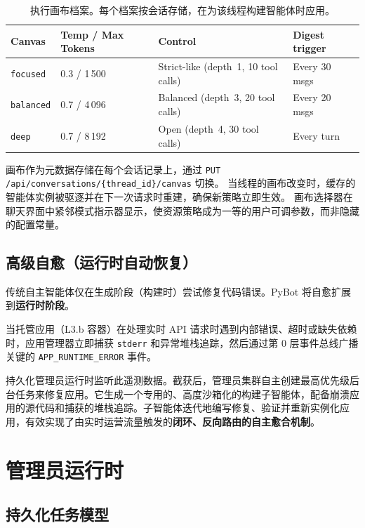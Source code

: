 \documentclass[11pt,a4paper]{article}
\begin{document}
\begin{table}[h]
\centering
\small
\begin{tabularx}{\textwidth}{lXXX}
\toprule
\textbf{Canvas} & \textbf{Temp / Max Tokens} & \textbf{Control} & \textbf{Digest trigger} \\
\midrule
\texttt{focused}  & 0.3 / 1\,500 & Strict-like (depth~1, 10 tool calls) & Every 30 msgs \\
\texttt{balanced} & 0.7 / 4\,096 & Balanced (depth~3, 20 tool calls)    & Every 20 msgs \\
\texttt{deep}     & 0.7 / 8\,192 & Open (depth~4, 30 tool calls)        & Every turn \\
\bottomrule
\end{tabularx}
\caption{执行画布档案。每个档案按会话存储，在为该线程构建智能体时应用。}
\label{tab:canvas}
\end{table}

画布作为元数据存储在每个会话记录上，通过 \texttt{PUT /api/conversations/\{thread\_id\}/canvas} 切换。
当线程的画布改变时，缓存的智能体实例被驱逐并在下一次请求时重建，确保新策略立即生效。
画布选择器在聊天界面中紧邻模式指示器显示，使资源策略成为一等的用户可调参数，而非隐藏的配置常量。

\subsection{高级自愈（运行时自动恢复）}

传统自主智能体仅在生成阶段（构建时）尝试修复代码错误。PyBot 将自愈扩展到\textbf{运行时阶段}。

当托管应用（L3.b 容器）在处理实时 API 请求时遇到内部错误、超时或缺失依赖时，应用管理器立即捕获 \texttt{stderr} 和异常堆栈追踪，然后通过第 0 层事件总线广播关键的 \texttt{APP\_RUNTIME\_ERROR} 事件。

持久化管理员运行时监听此遥测数据。截获后，管理员集群自主创建最高优先级后台任务来修复应用。它生成一个专用的、高度沙箱化的构建子智能体，配备崩溃应用的源代码和捕获的堆栈追踪。子智能体迭代地编写修复、验证并重新实例化应用，有效实现了由实时运营流量触发的\textbf{闭环、反向路由的自主愈合机制}。

\section{管理员运行时}
\label{sec:runtime}

\subsection{持久化任务模型}
\end{document}

